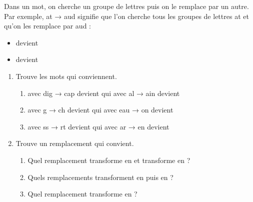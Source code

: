 \documentclass[class=report,crop=false, 12pt]{standalone}
\begin{document}
\begin{activite}

Dans un mot, on cherche un groupe de lettres puis on le remplace par un autre. Par exemple, \og at → aud \fg{} signifie que l'on cherche tous les groupes de lettres \og at \fg{} et qu'on les remplace par \og aud \fg{} :

\begin{itemize}
  \item {} devient 
  \item {} devient 
\end{itemize}

\begin{enumerate}
  \item Trouve les mots qui conviennent.
  \begin{enumerate}
    \item {} avec \og dig → cap \fg{} devient  qui avec \og al → ain \fg{} devient 
    \item {} avec \og g → ch \fg{} devient  qui avec \og eau → on \fg{} devient 
    \item {} avec \og ss → rt \fg{} devient  qui avec \og ar → en \fg{} devient 
  \end{enumerate}  

  \item Trouve un remplacement qui convient.
  \begin{enumerate}
    \item Quel remplacement transforme  en  et transforme  en  ?
    \item Quels remplacements transforment  en  puis en  ?
    \item Quel remplacement transforme  en  ?
  \end{enumerate}  
\end{enumerate}

\end{activite}
\end{document}
